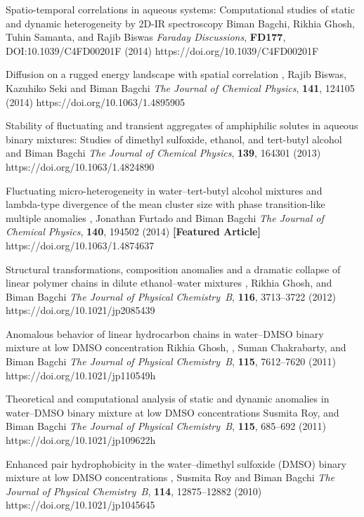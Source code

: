 %
        {Spatio-temporal correlations in aqueous systems:
         Computational studies of static and dynamic heterogeneity by 2D-IR spectroscopy}
        {Biman Bagchi, Rikhia Ghosh, Tuhin Samanta, \selfauthor{} and Rajib Biswas}
        {{\slshape Faraday Discussions}, {\bfseries FD177}, DOI:10.1039/C4FD00201F (2014)}
        {https://doi.org/10.1039/C4FD00201F}

%
        {Diffusion on a rugged energy landscape with spatial correlation}
        {\selfauthor{}, Rajib Biswas, Kazuhiko Seki and Biman Bagchi}
        {{\slshape The Journal of Chemical Physics}, {\bfseries 141}, 124105 (2014)}
        {https://doi.org/10.1063/1.4895905}


%
        {Stability of fluctuating and transient aggregates of amphiphilic solutes
        in aqueous binary mixtures: Studies of dimethyl sulfoxide, ethanol, and tert-butyl alcohol}
        {\selfauthor{} and Biman Bagchi}
        {{\slshape The Journal of Chemical Physics}, {\bfseries 139}, 164301 (2013)}
        {https://doi.org/10.1063/1.4824890}

%
        {Fluctuating micro-heterogeneity in water--tert-butyl alcohol mixtures and
        lambda-type divergence of the mean cluster size with phase transition-like
        multiple anomalies}
        {\selfauthor{}, Jonathan Furtado and Biman Bagchi}
        {{\slshape The Journal of Chemical Physics}, {\bfseries 140}, 194502 (2014) {\bfseries [Featured Article]}}
        {https://doi.org/10.1063/1.4874637}

%
        {Structural transformations, composition anomalies and a dramatic
        collapse of linear polymer chains in dilute ethanol--water mixtures}
        {\selfauthor{}, Rikhia Ghosh, and Biman Bagchi}
        {{\slshape The Journal of Physical Chemistry~B}, {\bfseries 116}, 3713--3722 (2012)}
        {https://doi.org/10.1021/jp2085439}

%
        {Anomalous behavior of linear hydrocarbon chains in water--DMSO
        binary mixture at low DMSO concentration}
        {Rikhia Ghosh, \selfauthor{}, Suman Chakrabarty, and Biman Bagchi}
        {{\slshape The Journal of Physical Chemistry~B}, {\bfseries 115}, 7612--7620 (2011)}
        {https://doi.org/10.1021/jp110549h}

%
        {Theoretical and computational analysis of static and dynamic anomalies
        in water--DMSO binary mixture at low DMSO concentrations}
        {Susmita Roy, \selfauthor{} and Biman Bagchi}
        {{\slshape The Journal of Physical Chemistry~B}, {\bfseries 115}, 685--692 (2011)}
        {https://doi.org/10.1021/jp109622h}

%
        {Enhanced pair hydrophobicity in the water--dimethyl sulfoxide (DMSO)
        binary mixture at low DMSO concentrations}
        {\selfauthor{}, Susmita Roy and Biman Bagchi}
        {{\slshape The Journal of Physical Chemistry~B}, {\bfseries 114}, 12875--12882 (2010)}
        {https://doi.org/10.1021/jp1045645}
